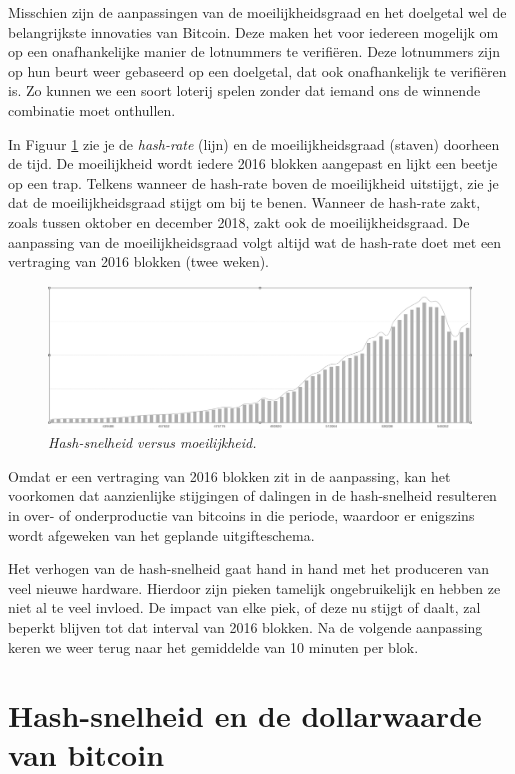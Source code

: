 Misschien zijn de aanpassingen van de moeilijkheidsgraad en het doelgetal wel de belangrijkste innovaties van Bitcoin. Deze maken het voor iedereen mogelijk om op een onafhankelijke manier de lotnummers te verifiëren. Deze lotnummers zijn op hun beurt weer gebaseerd op een doelgetal, dat ook onafhankelijk te verifiëren is. Zo kunnen we een soort loterij spelen zonder dat iemand ons de winnende combinatie moet onthullen.

In Figuur \ref{fig10} zie je de \textit{hash-rate} (lijn) en de moeilijkheidsgraad (staven) doorheen de tijd. De moeilijkheid wordt iedere 2016 blokken aangepast en lijkt een beetje op een trap. Telkens wanneer de hash-rate boven de moeilijkheid uitstijgt, zie je dat de moeilijkheidsgraad stijgt om bij te benen. Wanneer de hash-rate zakt, zoals tussen oktober en december 2018, zakt ook de moeilijkheidsgraad. De aanpassing van de moeilijkheidsgraad volgt altijd wat de hash-rate doet met een vertraging van 2016 blokken (twee weken).

\begin{figure}[h]
    \centering
    \includegraphics[width=\textwidth]{images/fig10.png}
    \caption{\footnotesize{\textit{Hash-snelheid versus moeilijkheid.}}}
    \label{fig10}
\end{figure}

Omdat er een vertraging van 2016 blokken zit in de aanpassing, kan het voorkomen dat aanzienlijke stijgingen of dalingen in de hash-snelheid resulteren in over- of onderproductie van bitcoins in die periode, waardoor er enigszins wordt afgeweken van het geplande uitgifteschema.

Het verhogen van de hash-snelheid gaat hand in hand met het produceren van veel nieuwe hardware. Hierdoor zijn pieken tamelijk ongebruikelijk en hebben ze niet al te veel invloed. De impact van elke piek, of deze nu stijgt of daalt, zal beperkt blijven tot dat interval van 2016 blokken. Na de volgende aanpassing keren we weer terug naar het gemiddelde van 10 minuten per blok.

\clearpage
\section{Hash-snelheid en de dollarwaarde van bitcoin}

